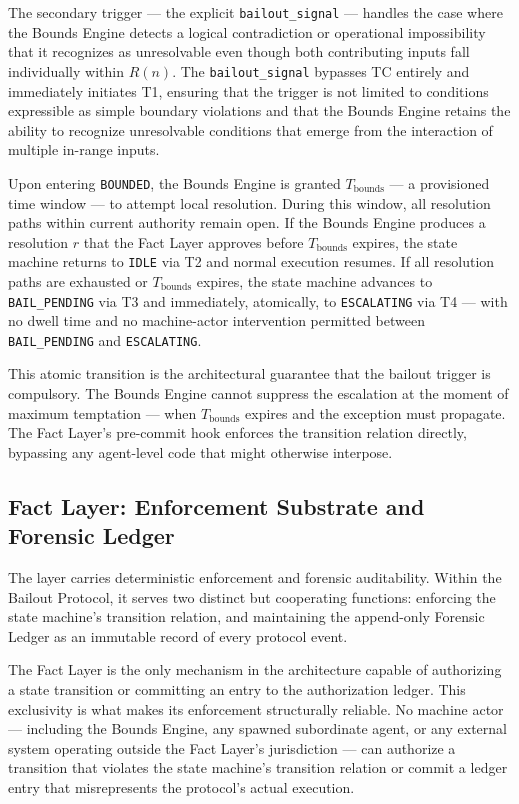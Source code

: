 The secondary trigger — the explicit \texttt{bailout\_signal} — handles the case where the Bounds Engine detects a logical contradiction or operational impossibility that it recognizes as unresolvable even though both contributing inputs fall individually within $R(n)$. The \texttt{bailout\_signal} bypasses TC entirely and immediately initiates T1, ensuring that the trigger is not limited to conditions expressible as simple boundary violations and that the Bounds Engine retains the ability to recognize unresolvable conditions that emerge from the interaction of multiple in-range inputs.

Upon entering \texttt{BOUNDED}, the Bounds Engine is granted $T_{\text{bounds}}$ — a provisioned time window — to attempt local resolution. During this window, all resolution paths within current authority remain open. If the Bounds Engine produces a resolution $r$ that the Fact Layer approves before $T_{\text{bounds}}$ expires, the state machine returns to \texttt{IDLE} via T2 and normal execution resumes. If all resolution paths are exhausted or $T_{\text{bounds}}$ expires, the state machine advances to \texttt{BAIL\_PENDING} via T3 and immediately, atomically, to \texttt{ESCALATING} via T4 — with no dwell time and no machine-actor intervention permitted between \texttt{BAIL\_PENDING} and \texttt{ESCALATING}.

This atomic transition is the architectural guarantee that the bailout trigger is compulsory. The Bounds Engine cannot suppress the escalation at the moment of maximum temptation — when $T_{\text{bounds}}$ expires and the exception must propagate. The Fact Layer's pre-commit hook enforces the transition relation directly, bypassing any agent-level code that might otherwise interpose.

\subsection{Fact Layer: Enforcement Substrate and Forensic Ledger}\label{sec:fact-layer}

The \fact{} layer carries deterministic enforcement and forensic auditability. Within the Bailout Protocol, it serves two distinct but cooperating functions: enforcing the state machine's transition relation, and maintaining the append-only Forensic Ledger as an immutable record of every protocol event.

The Fact Layer is the only mechanism in the \bxthree{} architecture capable of authorizing a state transition or committing an entry to the authorization ledger. This exclusivity is what makes its enforcement structurally reliable. No machine actor — including the Bounds Engine, any spawned subordinate agent, or any external system operating outside the Fact Layer's jurisdiction — can authorize a transition that violates the state machine's transition relation or commit a ledger entry that misrepresents the protocol's actual execution.


